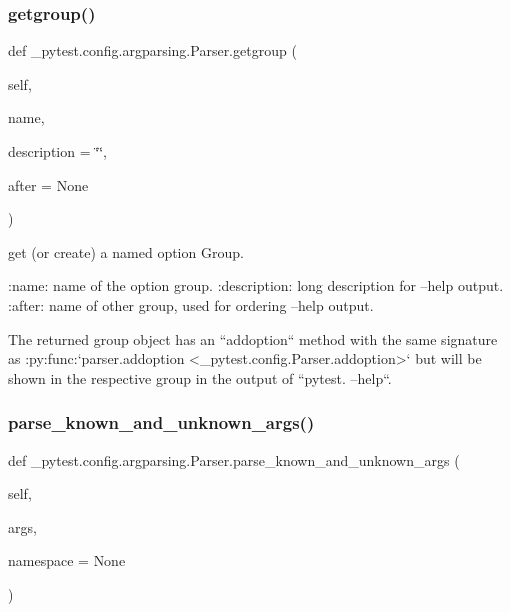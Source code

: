 \subsubsection{\texorpdfstring{getgroup()}{getgroup()}}
{\footnotesize\ttfamily def \+\_\+pytest.\+config.\+argparsing.\+Parser.\+getgroup (\begin{DoxyParamCaption}\item[{}]{self,  }\item[{}]{name,  }\item[{}]{description = {\ttfamily \char`\"{}\char`\"{}},  }\item[{}]{after = {\ttfamily None} }\end{DoxyParamCaption})}

\begin{DoxyVerb}get (or create) a named option Group.

:name: name of the option group.
:description: long description for --help output.
:after: name of other group, used for ordering --help output.

The returned group object has an ``addoption`` method with the same
signature as :py:func:`parser.addoption
<_pytest.config.Parser.addoption>` but will be shown in the
respective group in the output of ``pytest. --help``.
\end{DoxyVerb}
 \mbox{\label{class__pytest_1_1config_1_1argparsing_1_1_parser_a6ea809dfa8c13b61eec15e553aba3517}} 
\subsubsection{\texorpdfstring{parse\+\_\+known\+\_\+and\+\_\+unknown\+\_\+args()}{parse\_known\_and\_unknown\_args()}}
{\footnotesize\ttfamily def \+\_\+pytest.\+config.\+argparsing.\+Parser.\+parse\+\_\+known\+\_\+and\+\_\+unknown\+\_\+args (\begin{DoxyParamCaption}\item[{}]{self,  }\item[{}]{args,  }\item[{}]{namespace = {\ttfamily None} }\end{DoxyParamCaption})}

